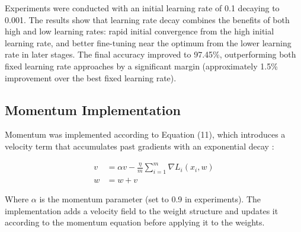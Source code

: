 \documentclass{article}
\begin{document}
\noindent Experiments were conducted with an initial learning rate of 0.1 decaying 
to 0.001. The results show that learning rate decay combines the benefits of both 
high and low learning rates: rapid initial convergence from the high initial 
learning rate, and better fine-tuning near the optimum from the lower learning 
rate in later stages. The final accuracy improved to 97.45\%, outperforming both 
fixed learning rate approaches by a significant margin (approximately 1.5\% 
improvement over the best fixed learning rate).

\subsection{Momentum Implementation}

Momentum was implemented according to Equation (11), which introduces a velocity term that accumulates past gradients with an exponential decay \cite{qian1999momentum, sutskever2013importance}:

\begin{align}
v &= \alpha v - \frac{\eta}{m}\sum_{i=1}^{m}\nabla L_{i}(x_{i},w) \\
w &= w + v
\end{align}

Where $\alpha$ is the momentum parameter (set to 0.9 in experiments). The implementation adds a velocity field to the weight structure and updates it according to the momentum equation before applying it to the weights.
\end{document}
